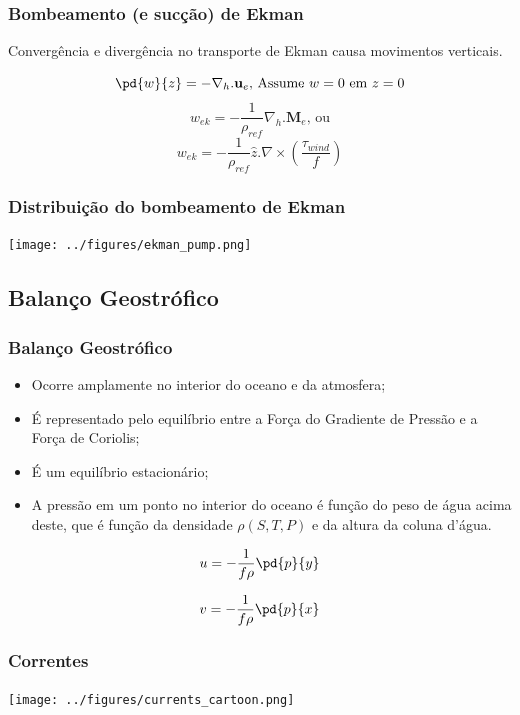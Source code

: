 \begin{frame}
  \frametitle{Bombeamento (e sucção) de Ekman}
  Convergência e divergência no transporte de Ekman causa movimentos verticais.
  \begin{block}{}
    \[
      \pd{w}{z} = -\nabla_h . \mathbf{u}_e \text{, Assume }w=0 \text{ em } z=0
    \]
    \[
      w_{ek} = -\frac{1}{\rho_{ref}}\nabla_h . \mathbf{M}_e \text{, ou}
    \]
    \[
      w_{ek} = -\frac{1}{\rho_{ref}}\hat{z} . \nabla \times \left( \frac{\tau_{wind}}{f} \right)
    \]
  \end{block}
\end{frame}

\begin{frame}
  \frametitle{Distribuição do bombeamento de Ekman}
      \begin{center}
        \texttt{[image: ../figures/ekman\_pump.png]}
      \end{center}
\end{frame}


\subsection{Balanço Geostrófico}
\begin{frame}
  \frametitle{Balanço Geostrófico}
  {\scriptsize
  \begin{itemize}[<+-| alert@+>]
    \item Ocorre amplamente no interior do oceano e da atmosfera;
    \item É representado pelo equilíbrio entre a Força do Gradiente de Pressão
          e a Força de Coriolis;
    \item É um equilíbrio estacionário;
    \item A pressão em um ponto no interior do oceano é função do peso de água
          acima deste, que é função da densidade $\rho(S, T, P)$ e da altura da
          coluna d'água.
  \end{itemize}
  \pause
  \begin{block}{}
    \[
      u = -\frac{1}{f\rho}\pd{p}{y}
    \]

    \[
      v = -\frac{1}{f\rho}\pd{p}{x}
    \]
  \end{block}
}
\end{frame}


\begin{frame}
  \frametitle{Correntes}
  \begin{center}
    \texttt{[image: ../figures/currents\_cartoon.png]}
  \end{center}
\end{frame}

